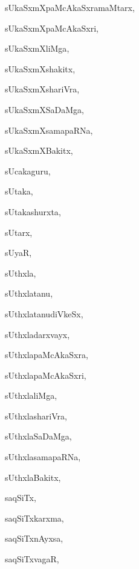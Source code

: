 \begin{multicols}{3}
{\noindent
{sUkaSxmXpaMcAkaSxramaMtarx}, \pageref{sUkaSxmXpaMcAkaSxramaMtarx}

\noindent
{sUkaSxmXpaMcAkaSxri}, \pageref{sUkaSxmXpaMcAkaSxri}

\noindent
{sUkaSxmXliMga}, \pageref{sUkaSxmXliMga}

\noindent
{sUkaSxmXshakitx}, \pageref{sUkaSxmXshakitx}

\noindent
{sUkaSxmXshariVra}, \pageref{sUkaSxmXshariVra}

\noindent
{sUkaSxmXSaDaMga}, \pageref{sUkaSxmXSaDaMga}

\noindent
{sUkaSxmXsamapaRNa}, \pageref{sUkaSxmXsamapaRNa}

\noindent
{sUkaSxmXBakitx}, \pageref{sUkaSxmXBakitx}

\noindent
{sUcakaguru}, \pageref{sUcakaguru}

\noindent
{sUtaka}, \pageref{sUtaka}

\noindent
{sUtakashurxta}, \pageref{sUtakashurxta}

\noindent
{sUtarx}, \pageref{sUtarx}

\noindent
{sUyaR}, \pageref{sUyaR}

\noindent
{sUthxla}, \pageref{sUthxla}

\noindent
{sUthxlatanu}, \pageref{sUthxlatanu}

\noindent
{sUthxlatanudiVkeSx}, \pageref{sUthxlatanudiVkeSx}

\noindent
{sUthxladarxvayx}, \pageref{sUthxladarxvayx}

\noindent
{sUthxlapaMcAkaSxra}, \pageref{sUthxlapaMcAkaSxra}

\noindent
{sUthxlapaMcAkaSxri}, \pageref{sUthxlapaMcAkaSxri}

\noindent
{sUthxlaliMga}, \pageref{sUthxlaliMga}

\noindent
{sUthxlashariVra}, \pageref{sUthxlashariVra}

\noindent
{sUthxlaSaDaMga}, \pageref{sUthxlaSaDaMga}

\noindent
{sUthxlasamapaRNa}, \pageref{sUthxlasamapaRNa}

\noindent
{sUthxlaBakitx}, \pageref{sUthxlaBakitx}

\noindent
{saqSiTx}, \pageref{saqSiTx}

\noindent
{saqSiTxkarxma}, \pageref{saqSiTxkarxma}

\noindent
{saqSiTxnAyxsa}, \pageref{saqSiTxnAyxsa}

\noindent
{saqSiTxvagaR}, \pageref{saqSiTxvagaR}

}
\end{multicols}

